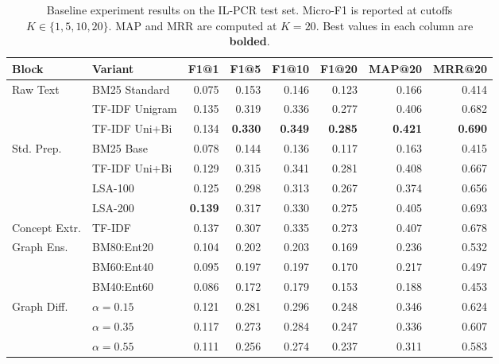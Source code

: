 \documentclass[11pt]{article}
\begin{document}
\begin{table}[!htbp]
\centering
\small
\setlength{\tabcolsep}{4pt}
\renewcommand{\arraystretch}{1.05}
\begin{tabular*}{\textwidth}{@{\extracolsep{\fill}} l l r r r r r r @{} }
\toprule
\textbf{Block} & \textbf{Variant} & \textbf{F1@1} & \textbf{F1@5} & \textbf{F1@10} & \textbf{F1@20} & \textbf{MAP@20} & \textbf{MRR@20} \\
\midrule
\multirow{3}{*}{Raw Text}
  & BM25 Standard     & 0.075 & 0.153 & 0.146 & 0.123 & 0.166 & 0.414 \\
  & TF-IDF Unigram    & 0.135 & 0.319 & 0.336 & 0.277 & 0.406 & 0.682 \\
  & TF-IDF Uni+Bi     & 0.134 & \textbf{0.330} & \textbf{0.349} & \textbf{0.285} & \textbf{0.421} & \textbf{0.690} \\
\midrule
\multirow{4}{*}{Std. Prep.}
  & BM25 Base          & 0.078 & 0.144 & 0.136 & 0.117 & 0.163 & 0.415 \\
  & TF-IDF Uni+Bi      & 0.129 & 0.315 & 0.341 & 0.281 & 0.408 & 0.667 \\
  & LSA-100            & 0.125 & 0.298 & 0.313 & 0.267 & 0.374 & 0.656 \\
  & LSA-200            & \textbf{0.139} & 0.317 & 0.330 & 0.275 & 0.405 & 0.693 \\
\midrule
Concept Extr. & TF-IDF & 0.137 & 0.307 & 0.335 & 0.273 & 0.407 & 0.678 \\
\midrule
\multirow{3}{*}{Graph Ens.}
  & BM80:Ent20       & 0.104 & 0.202 & 0.203 & 0.169 & 0.236 & 0.532 \\
  & BM60:Ent40       & 0.095 & 0.197 & 0.197 & 0.170 & 0.217 & 0.497 \\
  & BM40:Ent60       & 0.086 & 0.172 & 0.179 & 0.153 & 0.188 & 0.453 \\
\midrule
\multirow{3}{*}{Graph Diff.}
  & $\alpha{=}0.15$  & 0.121 & 0.281 & 0.296 & 0.248 & 0.346 & 0.624 \\
  & $\alpha{=}0.35$  & 0.117 & 0.273 & 0.284 & 0.247 & 0.336 & 0.607 \\
  & $\alpha{=}0.55$  & 0.111 & 0.256 & 0.274 & 0.237 & 0.311 & 0.583 \\
\bottomrule
\end{tabular*}
\caption{Baseline experiment results on the IL-PCR test set. Micro-F1 is reported at cutoffs $K \in \{1, 5, 10, 20\}$. MAP and MRR are computed at $K{=}20$. Best values in each column are \textbf{bolded}.}
\label{tab:baselines}
\end{table}
\end{document}
